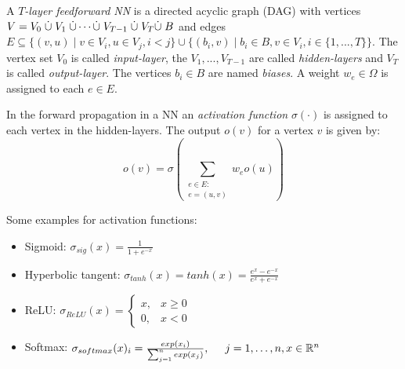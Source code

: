 \documentclass[a4paper, 12pt]{scrreprt} %
\begin{document}
\begin{definition}
A \emph{$T$-layer feedforward \acl{NN}} is a directed acyclic graph (DAG) with vertices $V = V_0 \hspace{0.1cm}\dot \cup\hspace{0.1cm} V_1 \hspace{0.1cm}\dot \cup \cdots \dot \cup\hspace{0.1cm} V_{T-1} \hspace{0.1cm}\dot \cup \hspace{0.1cm}V_T \dot \cup\hspace{0.1cm} B$ and edges $E \subseteq \{(v, u) \mid v \in V_i, u \in V_j, i < j\} \cup \{(b_i,v) \mid b_i \in B, v \in V_{i}, i \in \{1, ..., T\}\}$. The vertex set $V_0$  is called \emph{input-layer}, the $V_1, ..., V_{T-1}$ are called \emph{hidden-layers} and $V_T$ is called \emph{output-layer}. The vertices $b_i \in B$ are named \emph{biases}. A weight $w_e \in \Omega$ is assigned to each $e \in E$.

\end{definition}

In the forward propagation in a \ac{NN} an \emph{activation function} $\sigma(\cdot)$ is assigned to each vertex in the hidden-layers. The output $o(v)$ for a vertex $v$ is given by: 
\begin{equation}
\label{actFct}
o(v) = \sigma\left(\sum\limits_{\substack{e \in E :\\ e = (u,v)}} w_e o(u)\right)
\end{equation}

Some examples for activation functions:
\begin{itemize}
	\item Sigmoid: $\sigma_{sig}(x) = \frac{1}{1+e^{-x}}$
	\item Hyperbolic tangent: $\sigma_{tanh}(x) = tanh(x) = \frac{e^x-e^{-x}}{e^x+e^{-x}}$
	\item ReLU: $\sigma_{ReLU}(x) = \begin{cases} x, & x \geq 0 \\ 0, & x < 0\end{cases}$
	\item Softmax: $\sigma_{softmax}(x)_{i} = \frac{exp(x_i)}{\sum_{j=1}^{n}{exp(x_j)}}, \hspace{0.5cm} j=1, \dots, n, x\in \mathbb{R}^n$
\end{itemize}
\end{document}
